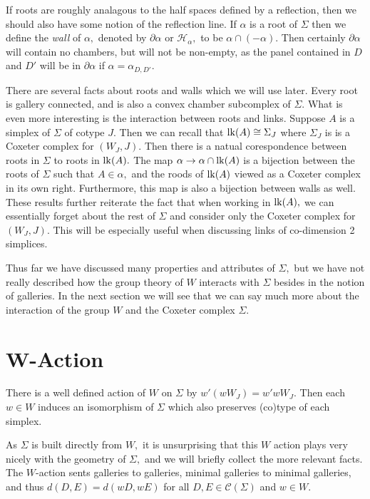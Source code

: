 \documentclass[class=book, crop=false,12 pt]{standalone}
\begin{document}
If roots are roughly analagous to the half spaces defined by a reflection, then we should also have some notion of the reflection line. If $\alpha$ is a root of $\Sigma$ then we define the \emph{wall} of $\alpha,$ denoted by $\partial\alpha$ or $\mathcal{H}_\alpha,$ to be $\alpha\cap (-\alpha).$ Then certainly $\partial \alpha$ will contain no chambers, but will not be non-empty, as the panel contained in $D$ and $D'$ will be in $\partial\alpha$ if $\alpha=\alpha_{D,D'}.$

There are several facts about roots and walls which we will use later. Every root is gallery connected, and is also a convex chamber subcomplex of $\Sigma.$ What is even more interesting is the interaction between roots and links. Suppose $A$ is a simplex of $\Sigma$ of cotype $J.$ Then we can recall that $\mathrm{lk}(A)\cong \Sigma_J$ where $\Sigma_J$ is is a Coxeter complex for $(W_J,J).$ Then there is a natual corespondence between roots in $\Sigma$ to roots in $\mathrm{lk}(A).$ The map $\alpha \to \alpha \cap \mathrm{lk}(A)$ is a bijection between the roots of $\Sigma$ such that $A\in \alpha,$ and the roods of $\mathrm{lk}(A)$ viewed as a Coxeter complex in its own right. Furthermore, this map is also a bijection between walls as well. These results further reiterate the fact that when working in $\mathrm{lk}(A),$ we can essentially forget about the rest of $\Sigma$ and consider only the Coxeter complex for $(W_J,J).$ This will be especially useful when discussing links of co-dimension 2 simplices.


Thus far we have discussed many properties and attributes of $\Sigma,$ but we have not really described how the group theory of $W$ interacts with $\Sigma$ besides in the notion of galleries. In the next section we will see that we can say much more about the interaction of the group $W$ and the Coxeter complex $\Sigma.$

\section{W-Action}
\begin{prop}
	\label{prop:wact}
	There is a well defined action of $W$ on $\Sigma$ by $w'(wW_J)=w'wW_J.$ Then each $w\in W$ induces an isomorphism of $\Sigma$ which also preserves (co)type of each simplex.
\end{prop}

As $\Sigma$ is built directly from $W,$ it is unsurprising that this $W$ action plays very nicely with the geometry of $\Sigma,$ and we will briefly collect the more relevant facts. The $W$-action sents galleries to galleries, minimal galleries to minimal galleries, and thus $d(D,E)=d(wD,wE)$ for all $D,E\in \mathcal{C}(\Sigma)$ and $w\in W.$ 
\end{document}
